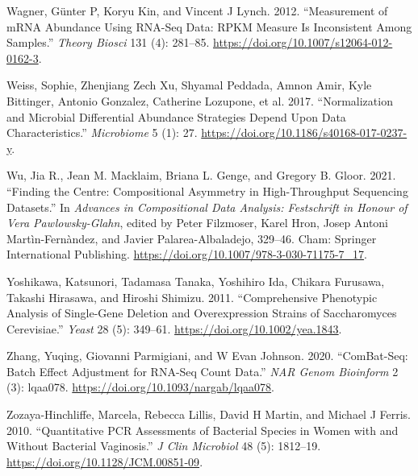 \documentclass[
]{article}
\newlength{\cslhangindent}
\newlength{\cslentryspacingunit} %
\newenvironment{CSLReferences}[2] %
 {%
  \setlength{\parindent}{0pt}
  \ifodd #1
  \let\oldpar\par
  \def\par{\hangindent=\cslhangindent\oldpar}
  \fi
  \setlength{\parskip}{#2\cslentryspacingunit}
 }%
 {}
\begin{document}
\begin{CSLReferences}{1}{0}
\leavevmode{}%
Wagner, Günter P, Koryu Kin, and Vincent J Lynch. 2012. {``Measurement
of mRNA Abundance Using RNA-Seq Data: RPKM Measure Is Inconsistent Among
Samples.''} \emph{Theory Biosci} 131 (4): 281--85.
\url{https://doi.org/10.1007/s12064-012-0162-3}.

\leavevmode{}%
Weiss, Sophie, Zhenjiang Zech Xu, Shyamal Peddada, Amnon Amir, Kyle
Bittinger, Antonio Gonzalez, Catherine Lozupone, et al. 2017.
{``Normalization and Microbial Differential Abundance Strategies Depend
Upon Data Characteristics.''} \emph{Microbiome} 5 (1): 27.
\url{https://doi.org/10.1186/s40168-017-0237-y}.

\leavevmode{}%
Wu, Jia R., Jean M. Macklaim, Briana L. Genge, and Gregory B. Gloor.
2021. {``Finding the Centre: Compositional Asymmetry in High-Throughput
Sequencing Datasets.''} In \emph{Advances in Compositional Data
Analysis: Festschrift in Honour of Vera Pawlowsky-Glahn}, edited by
Peter Filzmoser, Karel Hron, Josep Antoni Martìn-Fernàndez, and Javier
Palarea-Albaladejo, 329--46. Cham: Springer International Publishing.
\url{https://doi.org/10.1007/978-3-030-71175-7_17}.

\leavevmode{}%
Yoshikawa, Katsunori, Tadamasa Tanaka, Yoshihiro Ida, Chikara Furusawa,
Takashi Hirasawa, and Hiroshi Shimizu. 2011. {``Comprehensive Phenotypic
Analysis of Single-Gene Deletion and Overexpression Strains of
Saccharomyces Cerevisiae.''} \emph{Yeast} 28 (5): 349--61.
\url{https://doi.org/10.1002/yea.1843}.

\leavevmode{}%
Zhang, Yuqing, Giovanni Parmigiani, and W Evan Johnson. 2020.
{``ComBat-Seq: Batch Effect Adjustment for RNA-Seq Count Data.''}
\emph{NAR Genom Bioinform} 2 (3): lqaa078.
\url{https://doi.org/10.1093/nargab/lqaa078}.

\leavevmode{}%
Zozaya-Hinchliffe, Marcela, Rebecca Lillis, David H Martin, and Michael
J Ferris. 2010. {``Quantitative PCR Assessments of Bacterial Species in
Women with and Without Bacterial Vaginosis.''} \emph{J Clin Microbiol}
48 (5): 1812--19. \url{https://doi.org/10.1128/JCM.00851-09}.

\end{CSLReferences}
\end{document}
